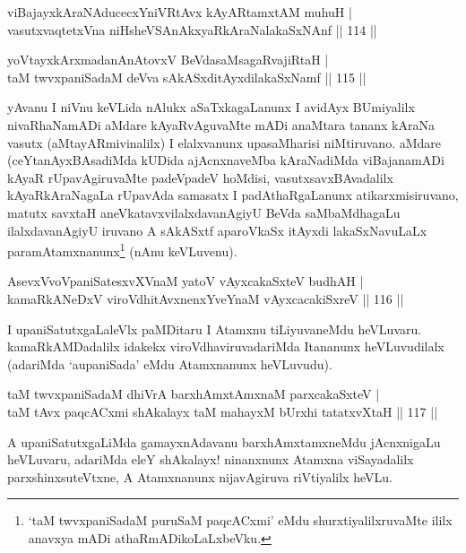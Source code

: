 \begin{shl}
viBajayxkAraNAducecxYniVRtAvx kAyARtamxtAM muhuH |\\
vasutxvaqtetxVna niHsheVSAnAkxyaRkAraNalakaSxNAnf \hfill || 114 ||
\end{shl}

\begin{shl}
yoV\s tayxkArxmadanAnAtovxV BeVdasaMsagaRvajiRtaH |\\
taM twvxpaniSadaM deVva sAkASxditAyxdilakaSxNamf \hfill || 115 ||
\end{shl}

\begin{artha}
yAvanu I niVnu keVLida nAlukx aSaTxkagaLanunx I avidAyx BUmiyalilx nivaRhaNamADi aMdare kAyaRvAguvaMte mADi anaMtara tananx kAraNa vasutx (aMtayARmivinalilx) I elalxvanunx upasaMharisi niMtiruvano. aMdare (ceYtanAyxBAsadiMda kUDida ajAcnxnaveMba kAraNadiMda viBajanamADi kAyaR rUpavAgiruvaMte padeVpadeV hoMdisi, vasutxsavxBAvadalilx kAyaRkAraNagaLa rUpavAda samasatx I padAthaRgaLanunx atikarxmisiruvano, matutx savxtaH aneVkatavxvilalxdavanAgiyU BeVda saMbaMdhagaLu ilalxdavanAgiyU iruvano A sAkASxtf aparoVkaSx itAyxdi lakaSxNavuLaLx paramAtamxnanunx\footnote[1]{`taM twvxpaniSadaM puruSaM paqcACxmi' eMdu shurxtiyalilxruvaMte ililx anavxya mADi athaRmADikoLaLxbeVku.} (nAnu keVLuvenu).
\end{artha}%


\begin{shl}
AsevxVvoVpaniSatesxvXVnaM yatoV vAyxcakaSxteV budhAH |\\
kamaRkANeDxV viroVdhitAvxnenxYveYnaM vAyxcacakiSxreV \hfill || 116 ||
\end{shl}

\begin{artha}
I upaniSatutxgaLaleVlx paMDitaru I Atamxnu tiLiyuvaneMdu heVLuvaru. kamaRkAMDadalilx idakekx viroVdhaviruvadariMda Itananunx heVLuvudilalx (adariMda `aupaniSada' eMdu Atamxnanunx heVLuvudu).
\end{artha}


\begin{shl}
taM twvxpaniSadaM dhiVrA barxhAmxtAmxnaM parxcakaSxteV |\\
taM tAvx paqcACxmi shAkalayx taM mahayxM bUrxhi tatatxvXtaH \hfill || 117 ||
\end{shl}

\begin{artha}
A upaniSatutxgaLiMda gamayxnAdavanu barxhAmxtamxneMdu jAcnxnigaLu heVLuvaru, adariMda eleY shAkalayx! ninanxnunx Atamxna viSayadalilx parxshinxsuteVtxne, A Atamxnanunx nijavAgiruva riVtiyalilx heVLu.
\end{artha}

